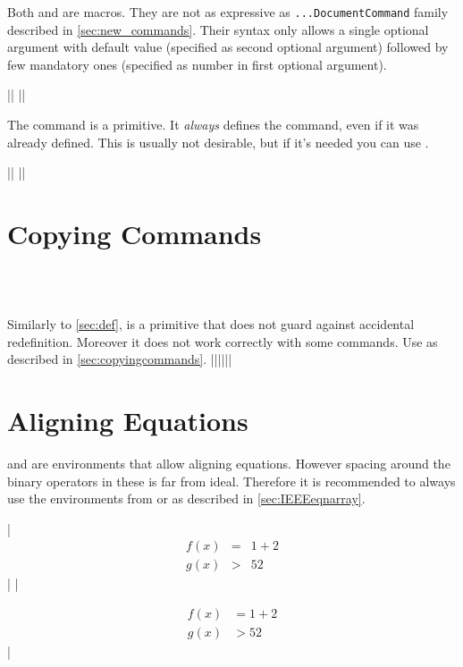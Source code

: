 Both  and  are  macros. They
are not as expressive as \texttt{...DocumentCommand} family  %
described in \autoref{sec:new_commands}. Their syntax only allows a single
optional argument with default value (specified as second optional argument)
followed by few mandatory ones (specified as number in first optional
argument).
\begin{chktexignore}
  \vchto|\newcommand{\foo}[4][bar]{ ... }|
  ||
\end{chktexignore}

The  command is a  primitive. It \emph{always} defines
the command, even if it was already defined. This is usually not desirable, but
if it's needed you can use .
\begin{chktexignore}
  \vchto|\def\foo#1#2#3{ ... }|
  ||
\end{chktexignore}

\section{Copying Commands}
 {
   \\
   \\
}

Similarly to \autoref{sec:def},  is a  primitive that
does not guard against accidental redefinition. Moreover it does not work
correctly with some  commands. Use  as
described in \autoref{sec:copyingcommands}.
\chto|\let\foo\bar||\NewCommandCopy\foo\bar|

\section{Aligning Equations}

 and  are  environments that allow
aligning equations. However spacing around the binary operators in these is far
from ideal. Therefore it is recommended to always use the  environments
from  or  as described in
\autoref{sec:IEEEeqnarray}.
\begin{chktexignore}
\chto
|\begin{eqnarray}
  f(x) & = &  1 + 2 \\
  g(x) & > & 52
\end{eqnarray}|
|\usepackage{amsmath}
\begin{align}
  f(x) & = 1 + 2 \\
  g(x) & > 52
\end{align}|
\end{chktexignore}

